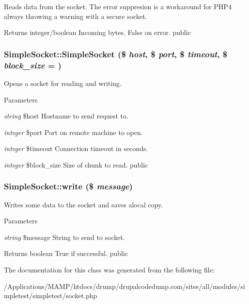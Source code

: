 Reads data from the socket. The error suppresion is a workaround for PHP4 always throwing a warning with a secure socket. \begin{DoxyReturn}{Returns}
integer/boolean Incoming bytes. False on error.  public 
\end{DoxyReturn}
\hypertarget{class_simple_socket_a98655f28b53a14f44635556f57776c6f}{
\subsubsection[{SimpleSocket}]{\setlength{\rightskip}{0pt plus 5cm}SimpleSocket::SimpleSocket (\$ {\em host}, \/  \$ {\em port}, \/  \$ {\em timeout}, \/  \$ {\em block\_\-size} = {})}}
\label{class_simple_socket_a98655f28b53a14f44635556f57776c6f}
Opens a socket for reading and writing. 
\begin{DoxyParams}{Parameters}
\item[{\em string}]\$host Hostname to send request to. \item[{\em integer}]\$port Port on remote machine to open. \item[{\em integer}]\$timeout Connection timeout in seconds. \item[{\em integer}]\$block\_\-size Size of chunk to read.  public \end{DoxyParams}
\hypertarget{class_simple_socket_a0c8a3adc1d670b4af4caf7f3f5a054b9}{
\subsubsection[{write}]{\setlength{\rightskip}{0pt plus 5cm}SimpleSocket::write (\$ {\em message})}}
\label{class_simple_socket_a0c8a3adc1d670b4af4caf7f3f5a054b9}
Writes some data to the socket and saves alocal copy. 
\begin{DoxyParams}{Parameters}
\item[{\em string}]\$message String to send to socket. \end{DoxyParams}
\begin{DoxyReturn}{Returns}
boolean True if successful.  public 
\end{DoxyReturn}


The documentation for this class was generated from the following file:\begin{DoxyCompactItemize}
\item 
/Applications/MAMP/htdocs/drump/drupalcodedump.com/sites/all/modules/simpletest/simpletest/socket.php\end{DoxyCompactItemize}
